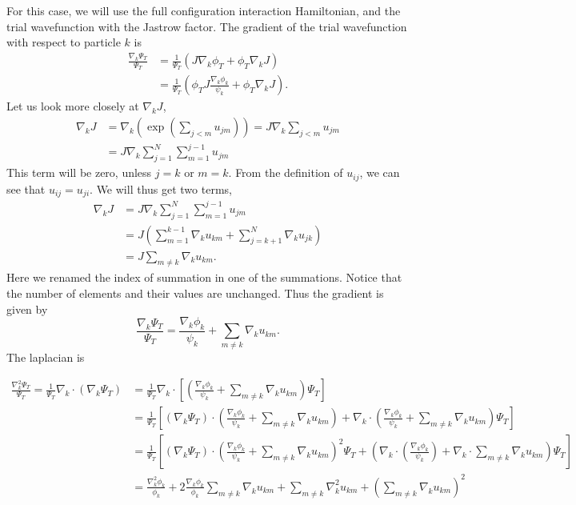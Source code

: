 \documentclass[aps,reprint,superscriptaddress,nofootinbib]{revtex4-2}
\begin{document}
    For this case, we will use the full configuration interaction Hamiltonian, and the trial wavefunction with the Jastrow factor. The gradient of the trial wavefunction with respect to particle \(k\) is
    \begin{align*}
        \frac{\nabla_k \Psi_T}{\Psi_T} &= \frac{1}{\Psi_T} (J \nabla_k \phi_T + \phi_T \nabla_k J) \\
        &= \frac{1}{\Psi_T} \left( \phi_T J \frac{\nabla_k \phi_k}{\psi_k} + \phi_T \nabla_k J \right).
    \end{align*}
    Let us look more closely at \(\nabla_k J\),
    \begin{align*}
        \nabla_k J &= \nabla_k \left( \exp \left( \sum_{j < m} u_{jm} \right) \right) = J \nabla_k \sum_{j < m} u_{jm} \\
        &= J \nabla_k \sum_{j=1}^N \sum_{m=1}^{j-1} u_{jm}
    \end{align*}
    This term will be zero, unless \(j=k\) or \(m=k\). From the definition of \(u_{ij}\), we can see that \(u_{ij} = u_{ji}\). We will thus get two terms,
    \begin{align*}
        \nabla_k J &= J \nabla_k \sum_{j=1}^N \sum_{m=1}^{j-1} u_{jm} \\
        &= J \left( \sum_{m = 1}^{k-1} \nabla_k u_{km} + \sum_{j = k+1}^N \nabla_k u_{jk} \right) \\
        &= J \sum_{m \neq k} \nabla_k u_{km}.
    \end{align*}
    Here we renamed the index of summation in one of the summations. Notice that the number of elements and their values are unchanged. Thus the gradient is given by
    \begin{equation*}
        \frac{\nabla_k \Psi_T}{\Psi_T} = \frac{\nabla_k \phi_k}{\psi_k} + \sum_{m \neq k} \nabla_k u_{km}.
    \end{equation*}
    The laplacian is
    \begin{widetext}
        \begin{align*}
            \frac{\nabla_k^2 \Psi_T}{\Psi_T} = \frac{1}{\Psi_T} \nabla_k \cdot (\nabla_k \Psi_T) &= \frac{1}{\Psi_T} \nabla_k \cdot \left[ \left( \frac{\nabla_k \phi_k}{\psi_k} + \sum_{m \neq k} \nabla_k u_{km}\right) \Psi_T \right] \\
            &= \frac{1}{\Psi_T} \left[ (\nabla_k \Psi_T) \cdot \left( \frac{\nabla_k \phi_k}{\psi_k} +\sum_{m \neq k} \nabla_k u_{km} \right) + \nabla_k \cdot \left( \frac{\nabla_k \phi_k}{\psi_k} +\sum_{m \neq k} \nabla_k u_{km} \right) \Psi_T \right] \\
            &= \frac{1}{\Psi_T} \left[ (\nabla_k \Psi_T) \cdot \left( \frac{\nabla_k \phi_k}{\psi_k} +\sum_{m \neq k} \nabla_k u_{km} \right)^2 \Psi_T + \left( \nabla_k \cdot \left( \frac{\nabla_k \phi_k}{\psi_k} \right) + \nabla_k \cdot \sum_{m \neq k} \nabla_k u_{km} \right) \Psi_T \right] \\
            &= \frac{\nabla_k^2 \phi_k}{\phi_k} + 2 \frac{\nabla_k \phi_k}{\phi_k} \sum_{m \neq k} \nabla_k u_{km} + \sum_{m \neq k} \nabla_k^2 u_{km} + \left( \sum_{m \neq k} \nabla_k u_{km} \right)^2
        \end{align*}
    \end{widetext}
\end{document}
